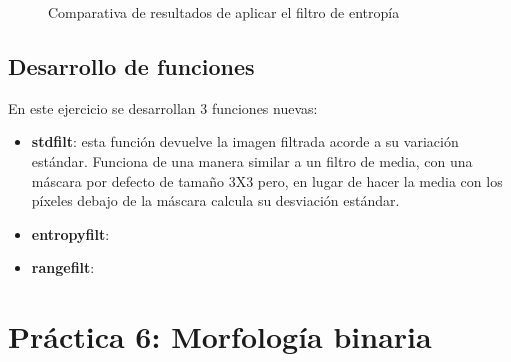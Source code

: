 \documentclass[a4paper,12pt]{report}
\begin{document}
\begin{figure}[!tbp]
  \centering
  \hfill
  \caption{Comparativa de resultados de aplicar el filtro de entropía}
  \label{entropyfilt}
\end{figure}


\subsection{Desarrollo de funciones}

En este ejercicio se desarrollan 3 funciones nuevas:
\begin{itemize}
	\item \textbf{ stdfilt}: esta función devuelve la imagen filtrada acorde a su variación estándar. Funciona de una manera similar a un filtro de media, con una máscara por defecto de tamaño 3X3 pero, en lugar de hacer la media con los píxeles debajo de la máscara calcula su desviación estándar.
	\item \textbf{ entropyfilt}:
	\item \textbf{rangefilt}:
\end{itemize}



\section{ Práctica 6: Morfología binaria}
\end{document}
